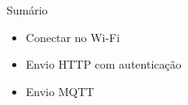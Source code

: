 \begin{frame}{Sumário}
    \begin{itemize}
        \item Conectar no Wi-Fi
        \item Envio HTTP com autenticação
        \item Envio MQTT
    \end{itemize}
\end{frame}